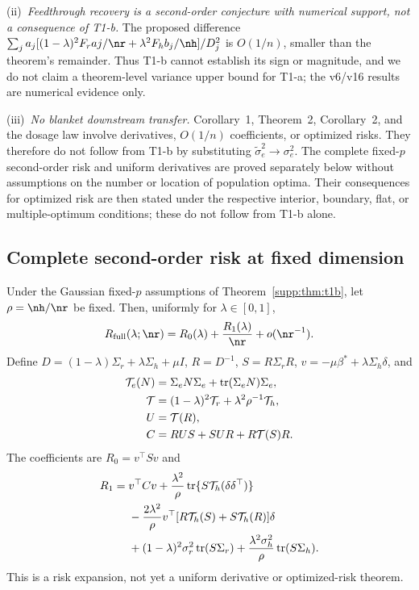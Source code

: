(ii)~\emph{Feedthrough recovery is a second-order conjecture with numerical support, not a consequence of T1-b.}
The proposed difference $\sum_j a_j[(1-\lambda)^2F_raj/\nr+\lambda^2F_hb_j/\nh]/D_j^2$ is $O(1/n)$, smaller than the theorem's remainder.
Thus T1-b cannot establish its sign or magnitude, and we do not claim a theorem-level variance upper bound for T1-a; the v6/v16 results are numerical evidence only.

(iii)~\emph{No blanket downstream transfer.}
Corollary~1, Theorem~2, Corollary~2, and the dosage law involve derivatives, $O(1/n)$ coefficients, or optimized risks.
They therefore do not follow from T1-b by substituting $\tilde\sigma_e^2\to\sigma_e^2$.
The complete fixed-$p$ second-order risk and uniform derivatives are proved separately below without assumptions on the number or location of population optima. Their consequences for optimized risk are then stated under the respective interior, boundary, flat, or multiple-optimum conditions; these do not follow from T1-b alone.

\subsection{Complete second-order risk at fixed dimension}

\begin{theorem}\label{supp:thm:t1c}
Under the Gaussian fixed-$p$ assumptions of Theorem~\ref{supp:thm:t1b}, let $\rho=\nh/\nr$ be fixed. Then, uniformly for $\lambda\in[0,1]$,
\begin{equation}
 R_{\mathrm{full}}(\lambda;\nr)=R_0(\lambda)+\frac{R_1(\lambda)}{\nr}+o(\nr^{-1}).
 \label{supp:eq:t1c}
\end{equation}
Define $D=(1-\lambda)\Sigma_r+\lambda\Sigma_h+\mu I$, $R=D^{-1}$, $S=R\Sigma_rR$, $v=-\mu\beta^*+\lambda\Sigma_h\delta$, and
\begin{align}
 \mathcal T_e(N)&=\Sigma_eN\Sigma_e+\operatorname{tr}(\Sigma_eN)\Sigma_e,\notag\\
 \mathcal T&=(1-\lambda)^2\mathcal T_r+\lambda^2\rho^{-1}\mathcal T_h,\notag\\
 U&=\mathcal T(R),\notag\\
 C&=RUS+SUR+R\mathcal T(S)R.
 \label{supp:eq:t1c-matrices}
\end{align}
The coefficients are $R_0=v^\top Sv$ and
\begin{align}
 R_1={}&v^\top Cv+\frac{\lambda^2}{\rho}\operatorname{tr}\{S\mathcal T_h(\delta\delta^\top)\}\notag\\
 &-\frac{2\lambda^2}{\rho}v^\top[R\mathcal T_h(S)+S\mathcal T_h(R)]\delta\notag\\
 &+(1-\lambda)^2\sigma_r^2\operatorname{tr}(S\Sigma_r)
 +\frac{\lambda^2\sigma_h^2}{\rho}\operatorname{tr}(S\Sigma_h).
 \label{supp:eq:t1c-r1}
\end{align}
This is a risk expansion, not yet a uniform derivative or optimized-risk theorem.
\end{theorem}

